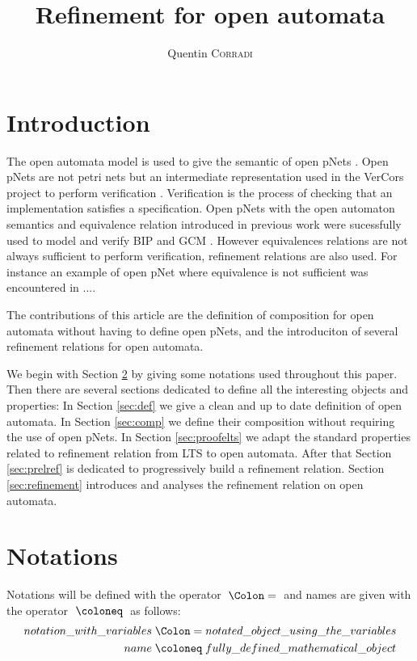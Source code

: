 \documentclass{article}
\title{Refinement for open automata}
\author{Quentin \textsc{Corradi}}
\begin{document}
\maketitle

\section{Introduction}
The open automata model is used to give the semantic of open pNets \cite{2007.10770}.
Open pNets are not petri nets but an intermediate representation used in the VerCors project to perform verification \cite{henrio:01252323}.
Verification is the process of checking that an implementation satisfies a specification.
Open pNets with the open automaton semantics and equivalence relation introduced in previous work \cite{2007.10770} were sucessfully used to model and verify BIP and GCM \cite{qin:01823507, ameurboulifa:01526055}.
However equivalences relations are not always sufficient to perform verification, refinement relations are also used.
For instance an example of open pNet where equivalence is not sufficient was encountered in ....

The contributions of this article are the definition of composition for open automata without having to define open pNets, and the introduciton of several refinement relations for open automata.


We begin with Section \ref{sec:notations} by giving some notations used throughout this paper.
Then there are several sections dedicated to define all the interesting objects and properties:
In Section \ref{sec:def} we give a clean and up to date definition of open automata.
In Section \ref{sec:comp} we define their composition without requiring the use of open pNets.
In Section \ref{sec:proofelts} we adapt the standard properties related to refinement relation from LTS to open automata.
After that Section \ref{sec:prelref} is dedicated to progressively build a refinement relation.
Section \ref{sec:refinement} introduces and analyses the refinement relation on open automata.


\section{Notations}\label{sec:notations}
Notations will be defined with the operator \(\defnotation\) and names are given with the operator \(\defobject\) as follows:
\begin{align*}
	notation\_with\_variables & \defnotation notated\_object\_using\_the\_variables \\
	name & \defobject fully\_defined\_mathematical\_object
\end{align*}
\end{document}
